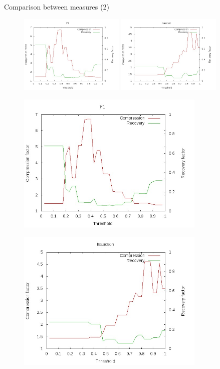 \documentclass[10pt]{beamer}
\begin{document}
\begin{frame}{Comparison between measures (2)}
 {
\begin{figure}
\centering
\includegraphics[width = 5cm]{images/F1Diag.jpg} \hspace{0.5cm}
\includegraphics[width = 5cm]{images/IsaacsonDiag.jpg}
\end{figure}}

 {
\begin{figure}
\centering
\includegraphics[width = 9cm]{images/F1Diag.jpg}
\end{figure}}

 {
\begin{figure}
\centering
\includegraphics[width = 9cm]{images/IsaacsonDiag.jpg}
\end{figure}}
\end{frame}
\end{document}
